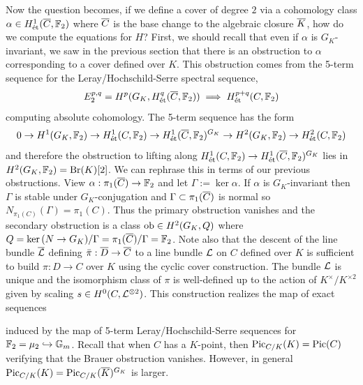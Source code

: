 \documentclass[main.tex]{subfiles}
\begin{document}
Now the question becomes, if we define a \etale cover of degree $2$ via a cohomology class $\alpha \in H^1_{\mathrm{\acute{e}t}}(\overline{C}, \mathbb{F}_2)$ where $\overline{C}$ is the base change to the algebraic closure $\overline{K}$, how do we compute the equations for $H$? First, we should recall that even if $\alpha$ is $G_K$-invariant, we saw in the previous section that there is an obstruction to $\alpha$ corresponding to a cover defined over $K$. This obstruction comes from the 5-term sequence for the Leray/Hochschild-Serre spectral sequence,
\[ E^{p,q}_2 = H^p(G_K, H^q_{\mathrm{\acute{e}t}}(\overline{C}, \mathbb{F}_2)) \implies H^{p+q}_{\mathrm{\acute{e}t}}(C, \mathbb{F}_2) \]
computing absolute \etale cohomology. The 5-term sequence has the form
\[ 0 \to H^1(G_K, \mathbb{F}_2) \to H^1_{\mathrm{\acute{e}t}}(C, \mathbb{F}_2) \to H^1_{\mathrm{\acute{e}t}}(\overline{C}, \mathbb{F}_2)^{G_K} \to H^2(G_K, \mathbb{F}_2) \to H^2_{\mathrm{\acute{e}t}}(C, \mathbb{F}_2) \]
and therefore the obstruction to lifting along $H^1_{\mathrm{\acute{e}t}}(C, \mathbb{F}_2) \to H^1_{\mathrm{\acute{e}t}}(\overline{C}, \mathbb{F}_2)^{G_K}$ lies in $H^2(G_K, \mathbb{F}_2) = \operatorname{\mathrm{Br}}(K)[2]$. We can rephrase this in terms of our previous obstructions. View $\alpha : \pi_1(\overline{C}) \to \mathbb{F}_2$ and let $\Gamma := \ker{\alpha}$. If $\alpha$ is $G_K$-invariant then $\Gamma$ is stable under $G_K$-conjugation and $\Gamma \subset \pi_1(\overline{C})$ is normal so $N_{\pi_1(C)}(\Gamma) = \pi_1(C)$. Thus the primary obstruction vanishes and the secondary obstruction is a class $\mathrm{ob} \in H^2(G_K, Q)$ where $Q = \ker{(N \to G_K)} / \Gamma = \pi_1(\overline{C})/\Gamma = \mathbb{F}_2$. Note also that the descent of the line bundle $\overline{\mathcal{L}}$ defining $\bar{\pi} : \overline{D} \to \overline{C}$ to a line bundle $\mathcal{L}$ on $C$ defined over $K$ is sufficient to build $\pi : D \to C$ over $K$ using the cyclic cover construction. The bundle $\mathcal{L}$ is unique and the isomorphism class of $\pi$ is well-defined up to the action of $K^{\times} / K^{\times 2}$ given by scaling $s \in H^0(C, \mathcal{L}^{\otimes 2})$. This construction realizes the map of exact sequences
\begin{center}
\end{center}
induced by the map of 5-term Leray/Hochschild-Serre sequences for $\mathbb{F}_2 = \mu_2 \hookrightarrow \mathbb{G}_m$. Recall that when $C$ has a $K$-point, then $\operatorname{\mathrm{Pic}}_{C/K}(K) = \operatorname{\mathrm{Pic}}(C)$ verifying that the Brauer obstruction vanishes. However, in general $\operatorname{\mathrm{Pic}}_{C/K}(K) = \operatorname{\mathrm{Pic}}_{C/K}(\overline{K})^{G_K}$ is larger.
\end{document}
